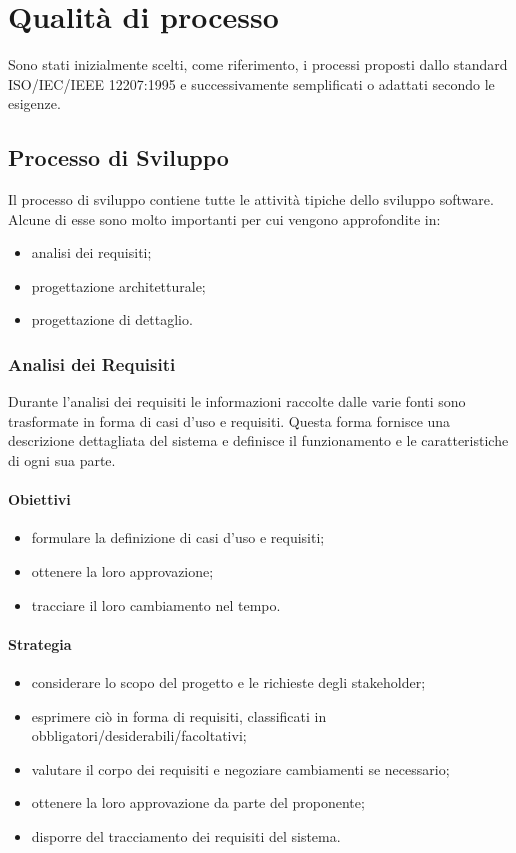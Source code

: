 \section{Qualità di processo}
Sono stati inizialmente scelti, come riferimento, i processi proposti dallo standard ISO/IEC/IEEE 12207:1995 e successivamente semplificati o adattati secondo le esigenze.


	\subsection{Processo di Sviluppo}
	Il processo di sviluppo contiene tutte le attività tipiche dello sviluppo software. Alcune di esse sono molto importanti per cui vengono approfondite in: 
	\begin{itemize}
		\item analisi dei requisiti;
		\item progettazione architetturale;
		\item progettazione di dettaglio.
	\end{itemize}
	\subsubsection{Analisi dei Requisiti}
	Durante l'analisi dei requisiti le informazioni raccolte dalle varie fonti sono trasformate in forma di casi d'uso e requisiti.
	Questa forma fornisce una descrizione dettagliata del sistema e definisce il funzionamento e le caratteristiche di ogni sua parte.
		\paragraph{Obiettivi}
		\begin{itemize}
			\item formulare la definizione di casi d'uso e requisiti;
			\item ottenere la loro approvazione;
			\item tracciare il loro cambiamento nel tempo.
		\end{itemize}		
		\paragraph{Strategia}
		\begin{itemize}
			\item considerare lo scopo del progetto e le richieste degli stakeholder\glo;
			\item esprimere ciò in forma di requisiti, classificati in obbligatori/desiderabili/facoltativi;
			\item valutare il corpo dei requisiti e negoziare cambiamenti se necessario;
			\item ottenere la loro approvazione da parte del proponente;
			\item disporre del tracciamento dei requisiti del sistema.
		\end{itemize}
		
